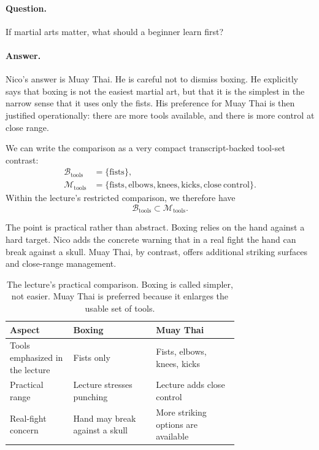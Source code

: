 \paragraph{Question.} If martial arts matter, what should a beginner learn first?

\paragraph{Answer.} Nico's answer is Muay Thai. He is careful not to dismiss boxing. He explicitly says that boxing is not the easiest martial art, but that it is the simplest in the narrow sense that it uses only the fists. His preference for Muay Thai is then justified operationally: there are more tools available, and there is more control at close range.

We can write the comparison as a very compact transcript-backed tool-set contrast:
\begin{align}
\mathcal{B}_{\mathrm{tools}} &= \{\mathrm{fists}\},\\
\mathcal{M}_{\mathrm{tools}} &= \{\mathrm{fists},\mathrm{elbows},\mathrm{knees},\mathrm{kicks},\mathrm{close\ control}\}.
\end{align}
Within the lecture's restricted comparison, we therefore have
\begin{equation}
\mathcal{B}_{\mathrm{tools}} \subset \mathcal{M}_{\mathrm{tools}}.
\end{equation}

The point is practical rather than abstract. Boxing relies on the hand against a hard target. Nico adds the concrete warning that in a real fight the hand can break against a skull. Muay Thai, by contrast, offers additional striking surfaces and close-range management.

\begin{table}[h]
\centering
\begin{tabular}{|p{0.18\linewidth}|p{0.28\linewidth}|p{0.28\linewidth}|}
\hline
Aspect & Boxing & Muay Thai \\
\hline
Tools emphasized in the lecture & Fists only & Fists, elbows, knees, kicks \\
\hline
Practical range & Lecture stresses punching & Lecture adds close control \\
\hline
Real-fight concern & Hand may break against a skull & More striking options are available \\
\hline
\end{tabular}
\caption{The lecture's practical comparison. Boxing is called simpler, not easier. Muay Thai is preferred because it enlarges the usable set of tools.}
\end{table}

